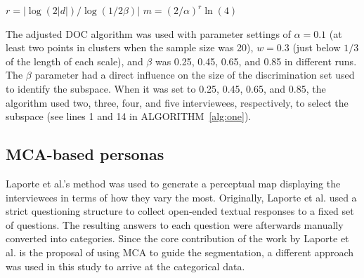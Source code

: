 \IncMargin{1em}
\begin{algorithm}[t]
\DontPrintSemicolon
{}
$r = | \log (2|d|) / \log (1/2\beta) |$\;
$m = (2/\alpha )^r\ln (4)$\;
\;
\caption{Modified DOC algorithm based on that proposed by \cite{Procopiuc2002}}
\label{alg:one}
\end{algorithm}
\DecMargin{1em}

The adjusted DOC algorithm was used with parameter settings of $\alpha = 0.1$ (at least two points in clusters when the sample size was 20), $w = 0.3$ (just below $1/3$ of the length of each scale), and $\beta$ was 0.25, 0.45, 0.65, and 0.85 in different runs. The $\beta$ parameter had a direct influence on the size of the discrimination set used to identify the subspace. When it was set to 0.25, 0.45, 0.65, and 0.85, the algorithm used two, three, four, and five interviewees, respectively, to select the subspace (see lines 1 and 14 in ALGORITHM~\ref{alg:one}). %



\subsection{MCA-based personas}
Laporte et al.'s method \citep{Laporte2012} was used to generate a perceptual map displaying the interviewees in terms of how they vary the most. Originally, Laporte et al. used a strict questioning structure to collect open-ended textual responses to a fixed set of questions. The resulting answers to each question were afterwards manually converted into categories. Since the core contribution of the work by Laporte et al. is the proposal of using MCA to guide the segmentation, a different approach was used in this study to arrive at the categorical data.

